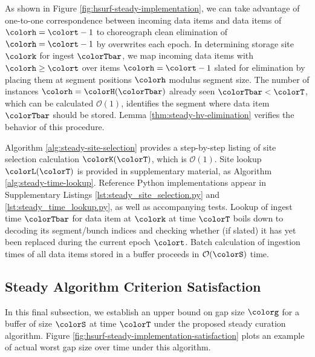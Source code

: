 As shown in Figure \ref{fig:hsurf-steady-implementation}, we can take advantage of one-to-one correspondence between incoming data items and data items of \hv{} $\colorh=\colort-1$ to choreograph clean elimination of \hv{} $\colorh=\colort-1$ by overwrites each epoch.
In determining storage site $\colork$ for ingest $\colorTbar$, we map incoming data items with \hv{} $\colorh \geq \colort$ over items $\colorh = \colort - 1$ slated for elimination by placing them at segment positions $\colorh$ modulus segment size.
The number of \hv{} instances $\colorh = \colorH(\colorTbar)$ already seen $\colorTbar < \colorT$, which can be calculated $\mathcal{O}(1)$, identifies the segment where data item $\colorTbar$ should be stored.
Lemma \ref{thm:steady-hv-elimination} verifies the behavior of this procedure.



Algorithm \ref{alg:steady-site-selection} provides a step-by-step listing of site selection calculation $\colorK(\colorT)$, which is $\mathcal{O}(1)$.
Site lookup $\colorL(\colorT)$ is provided in supplementary material, as Algorithm \ref{alg:steady-time-lookup}.
Reference Python implementations appear in Supplementary Listings \ref{lst:steady_site_selection.py} and \ref{lst:steady_time_lookup.py}, as well as accompanying tests.
Lookup of ingest time $\colorTbar$ for data item at $\colork$ at time $\colorT$ boils down to decoding its segment/bunch indices and checking whether (if slated) it has yet been replaced during the current epoch $\colort$.
Batch calculation of ingestion times of all data items stored in a buffer proceeds in $\mathcal{O}(\colorS)$ time.

\subsection{Steady Algorithm Criterion Satisfaction}
\label{sec:stready-satisfaction}

In this final subsection, we establish an upper bound on gap size $\colorg$ for a buffer of size $\colorS$ at time $\colorT$ under the proposed steady curation algorithm.
Figure \ref{fig:hsurf-steady-implementation-satisfaction} plots an example of actual worst gap size over time under this algorithm.


